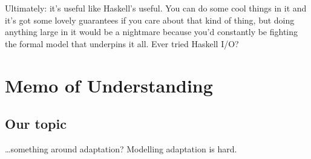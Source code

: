 \documentclass{article}
\begin{document}
Ultimately: it's useful like Haskell's useful. You can do some cool things in it and it's got some lovely guarantees if
you care about that kind of thing, but doing anything large in it would be a nightmare because you'd constantly be
fighting the formal model that underpins it all. Ever tried Haskell I/O?\par



\section{Memo of Understanding} %

\subsection{Our topic}

\ldots{}something around adaptation? Modelling adaptation is hard.


\end{document}
